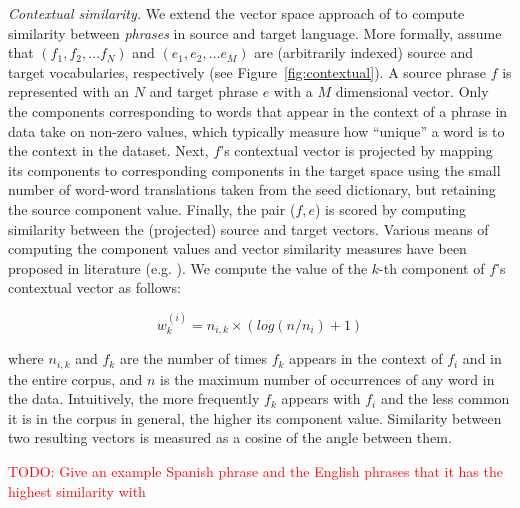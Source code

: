\documentclass[11pt]{article}
\newcommand{\todo}[1]{\textcolor{red}{TODO: #1}}
\newcommand{\figref}[1]{Figure~\ref{#1}}
\begin{document}
\noindent\emph{Contextual similarity.}  We extend the vector space approach of \cite{Rapp:1999} to compute similarity between \emph{phrases} in source and target language.  More formally, assume that $(f_{1}, f_{2}, \dots f_{N})$ and $(e_{1}, e_{2}, \dots e_{M})$ are (arbitrarily indexed) source and target vocabularies, respectively (see \figref{fig:contextual}).  A source phrase $f$ is represented with an $N$ and target phrase $e$ with a $M$ dimensional vector.  Only the components corresponding to words that appear in the context of a phrase in data take on non-zero values, which typically measure how ``unique'' a word is to the context in the dataset.  Next, $f$'s contextual vector is projected by mapping its components to corresponding components in the target space using the small number of word-word translations taken from the seed dictionary, but retaining the source component value.  Finally, the pair ($f, e$) is scored by computing similarity between the (projected) source and target vectors.  Various means of computing the component values and vector similarity measures have been proposed in literature (e.g. ).  We compute the value of the $k$-th component of $f$'s contextual vector  as follows: 

\begin{equation*}
w_{k}^{(i)} = n_{i,k} \times (log( {n / n_{i}}) + 1)
\end{equation*}

\noindent where $n_{i,k}$ and $f_{k}$ are the number of times $f_{k}$ appears in the context of $f_{i}$ and in the entire corpus, and $n$ is the maximum number of occurrences of any word in the data.  Intuitively, the more frequently $f_{k}$ appears with $f_{i}$ and the less common it is in the corpus in general, the higher its component value.  Similarity between two resulting vectors is measured as a cosine of the angle between them.

\todo{Give an example Spanish phrase and the English phrases that it has the highest similarity with}
\end{document}
